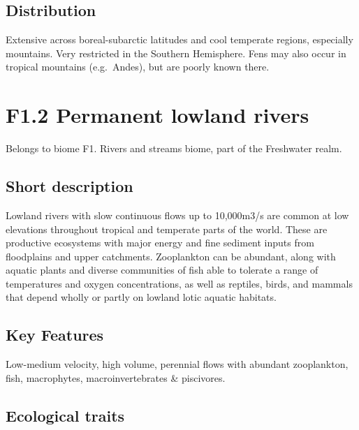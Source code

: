 \documentclass[
  letterpaper,
  DIV=11,
  numbers=noendperiod]{scrartcl}
\begin{document}
\subsection{Distribution}\label{distribution-109}

Extensive across boreal-subarctic latitudes and cool temperate regions,
especially mountains. Very restricted in the Southern Hemisphere. Fens
may also occur in tropical mountains (e.g.~Andes), but are poorly known
there.

\section{F1.2 Permanent lowland
rivers}\label{f1.2-permanent-lowland-rivers-1}

Belongs to biome F1. Rivers and streams biome, part of the Freshwater
realm.

\subsection{Short description}\label{short-description-110}

Lowland rivers with slow continuous flows up to 10,000m3/s are common at
low elevations throughout tropical and temperate parts of the world.
These are productive ecosystems with major energy and fine sediment
inputs from floodplains and upper catchments. Zooplankton can be
abundant, along with aquatic plants and diverse communities of fish able
to tolerate a range of temperatures and oxygen concentrations, as well
as reptiles, birds, and mammals that depend wholly or partly on lowland
lotic aquatic habitats.

\subsection{Key Features}\label{key-features-110}

Low-medium velocity, high volume, perennial flows with abundant
zooplankton, fish, macrophytes, macroinvertebrates \& piscivores.

\subsection{Ecological traits}\label{ecological-traits-110}
\end{document}
